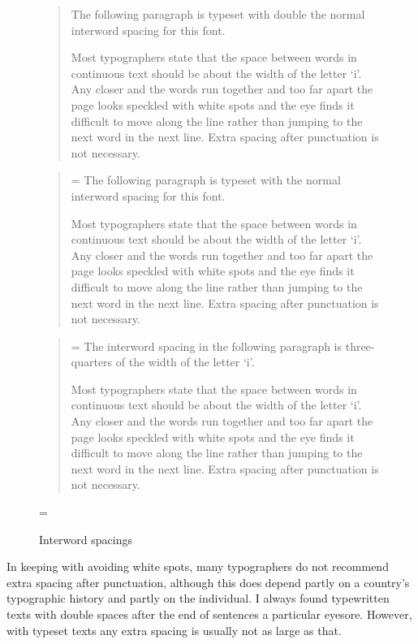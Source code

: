 \documentclass[10pt,letterpaper,extrafontsizes]{memoir}
\begin{document}
\setlength{\unitlength}{\fontdimen2\font}
\begin{figure}
\centering
\begin{minipage}{\textwidth}
\mbox{}\hrulefill\mbox{}
\begin{quotation}
\font
    The following paragraph is typeset with double the normal interword 
spacing for this font.

    Most typographers state that the space between words in continuous
text should be about the width of the letter `i'. Any closer and the
words run together and too far apart the page looks speckled with white
spots and the eye finds it difficult to move along the line rather than
jumping to the next word in the next line. 
Extra spacing after punctuation is not necessary.
\end{quotation}
\begin{quotation}
\font=\unitlength
    The following paragraph is typeset with the normal interword spacing 
for this font.

    Most typographers state that the space between words in continuous
text should be about the width of the letter `i'. Any closer and the
words run together and too far apart the page looks speckled with white
spots and the eye finds it difficult to move along the line rather than
jumping to the next word in the next line. 
Extra spacing after punctuation is not necessary.
\end{quotation}
\begin{quotation}
\settowidth{\unitlength}{i}
\setlength{\unitlength}{0.75\unitlength}
\font=\unitlength
    The interword spacing in the following paragraph is three-quarters of
the width of the letter `i'.
 
    Most typographers state that the space between words in continuous
text should be about the width of the letter `i'. Any closer and the
words run together and too far apart the page looks speckled with white
spots and the eye finds it difficult to move along the line rather than
jumping to the next word in the next line. 
Extra spacing after punctuation is not necessary.
\end{quotation}
\mbox{}\hrulefill\mbox{}
\end{minipage}
\font=\unitlength \setlength{\unitlength}{1pt}
\caption{Interword spacings}\label{fig:interword}
\end{figure}

    In keeping with avoiding white spots, many typographers do not
recommend extra spacing after punctuation, although this does depend
partly on a country's typographic history and partly on the individual.
I always found typewritten texts with double spaces after the end
of sentences a particular eyesore. However, with typeset texts any 
extra spacing is usually not as large as that.
\end{document}
